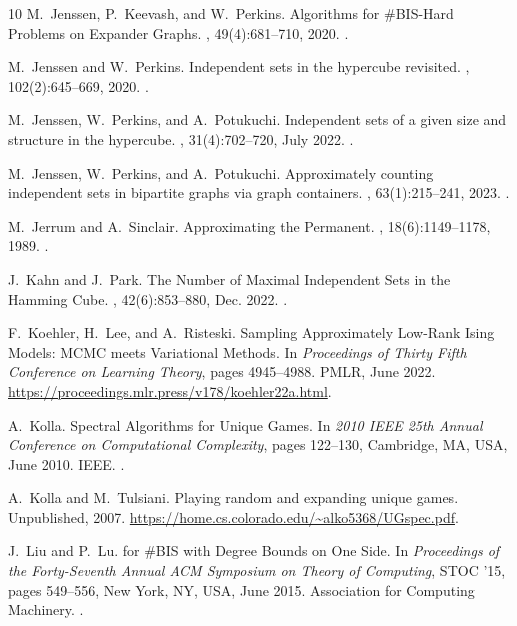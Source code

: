 \documentclass[11pt,letterpaper]{amsart}
\theoremstyle{definition}
\begin{document}
\begin{thebibliography}{10}
M.~Jenssen, P.~Keevash, and W.~Perkins.
\newblock Algorithms for {{\#BIS-Hard Problems}} on {{Expander Graphs}}.
, 49(4):681--710, 2020.
\newblock {}.

M.~Jenssen and W.~Perkins.
\newblock Independent sets in the hypercube revisited.
, 102(2):645--669,
  2020.
\newblock {}.

M.~Jenssen, W.~Perkins, and A.~Potukuchi.
\newblock Independent sets of a given size and structure in the hypercube.
, 31(4):702--720, July
  2022.
\newblock {}.

M.~Jenssen, W.~Perkins, and A.~Potukuchi.
\newblock Approximately counting independent sets in bipartite graphs via graph
  containers.
, 63(1):215--241, 2023.
\newblock {}.

M.~Jerrum and A.~Sinclair.
\newblock Approximating the {{Permanent}}.
, 18(6):1149--1178, 1989.
\newblock {}.

J.~Kahn and J.~Park.
\newblock The {{Number}} of {{Maximal Independent Sets}} in the {{Hamming
  Cube}}.
, 42(6):853--880, Dec. 2022.
\newblock {}.

F.~Koehler, H.~Lee, and A.~Risteski.
\newblock Sampling {{Approximately Low-Rank Ising Models}}: {{MCMC}} meets
  {{Variational Methods}}.
\newblock In {\em Proceedings of {{Thirty Fifth Conference}} on {{Learning
  Theory}}}, pages 4945--4988. {PMLR}, June 2022.
\newblock \urlprefix\url{https://proceedings.mlr.press/v178/koehler22a.html}.

A.~Kolla.
\newblock Spectral {{Algorithms}} for {{Unique Games}}.
\newblock In {\em 2010 {{IEEE}} 25th {{Annual Conference}} on {{Computational
  Complexity}}}, pages 122--130, {Cambridge, MA, USA}, June 2010. {IEEE}.
\newblock {}.

A.~Kolla and M.~Tulsiani.
\newblock Playing random and expanding unique games.
\newblock Unpublished, 2007.
\newblock \urlprefix\url{https://home.cs.colorado.edu/~alko5368/UGspec.pdf}.

J.~Liu and P.~Lu.
 for \#{{BIS}} with {{Degree Bounds}} on {{One Side}}.
\newblock In {\em Proceedings of the Forty-Seventh Annual {{ACM}} Symposium on
  {{Theory}} of {{Computing}}}, {{STOC}} '15, pages 549--556, {New York, NY,
  USA}, June 2015. {Association for Computing Machinery}.
\newblock {}.


\end{thebibliography}
\end{document}
